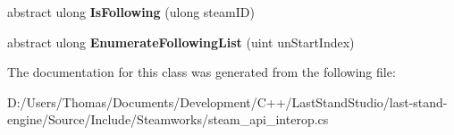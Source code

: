 \begin{DoxyCompactItemize}
\item 
\hypertarget{classValve_1_1Steamworks_1_1ISteamFriends_a1cd0bdb2297fad8ccf0a9c3b260d2274}{}abstract ulong {\bfseries Is\+Following} (ulong steam\+I\+D)\label{classValve_1_1Steamworks_1_1ISteamFriends_a1cd0bdb2297fad8ccf0a9c3b260d2274}

\item 
\hypertarget{classValve_1_1Steamworks_1_1ISteamFriends_afb149a34db71a89977ed7b80402c450c}{}abstract ulong {\bfseries Enumerate\+Following\+List} (uint un\+Start\+Index)\label{classValve_1_1Steamworks_1_1ISteamFriends_afb149a34db71a89977ed7b80402c450c}

\end{DoxyCompactItemize}


The documentation for this class was generated from the following file\+:\begin{DoxyCompactItemize}
\item 
D\+:/\+Users/\+Thomas/\+Documents/\+Development/\+C++/\+Last\+Stand\+Studio/last-\/stand-\/engine/\+Source/\+Include/\+Steamworks/steam\+\_\+api\+\_\+interop.\+cs\end{DoxyCompactItemize}

